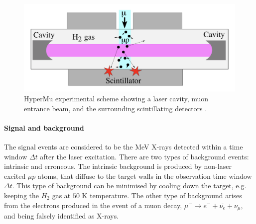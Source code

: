 \documentclass[12pt]{article}
\begin{document}
\begin{figure}[h]
\includegraphics[width=1.0\textwidth]{img/targetscheme}
\caption{HyperMu experimental scheme showing a laser cavity, muon entrance beam, and the surrounding scintillating detectors \cite{proposal}.}
\label{fig:targetscheme}
\end{figure}



\paragraph{Signal and background}\label{para:signature}
The signal events are considered to be the MeV X-rays detected within a time window ${\Delta}t$ after the laser excitation. There are two types of background events: intrinsic and erroneous. The intrinsic background is produced by non-laser excited ${\mu}p$ atoms, that diffuse to the target walls in the observation time window ${\Delta}t$. This type of background can be minimised by cooling down the target, e.g. keeping the $H_2$ gas at $50$ K temperature. The other type of background arises from the electrons produced in the event of a muon decay, ${\mu}^- \rightarrow e^- + \overline{{\nu}_e} + {\nu}_{\mu}$, and being falsely identified as X-rays. 
\end{document}
